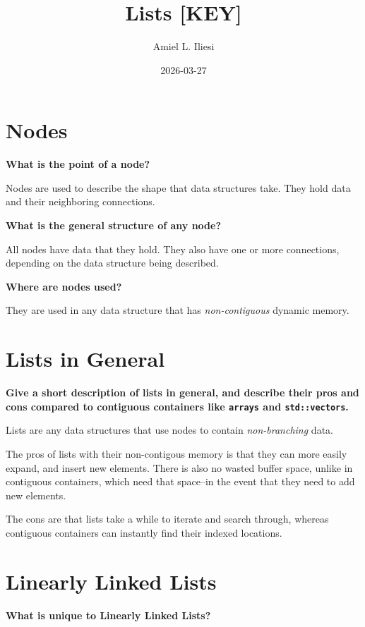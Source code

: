\documentclass[12pt, letterpaper]{article}
\title{Lists \color{red}\textbf{[KEY]}\normalcolor}
\author{Amiel L. Iliesi}
\date{2026-03-27}
\newcommand{\question}[1]{\textbf{#1}\par}
\newenvironment{ansblock}{\color{Green4}}{\normalcolor\vspace{1em}}
\begin{document}
\maketitle

\tableofcontents

\pagebreak
\section{Nodes}
\question{What is the point of a node?}
\begin{ansblock}
Nodes are used to describe the shape that data structures take. They hold data
and their neighboring connections.
\end{ansblock}

\question{What is the general structure of any node?}
\begin{ansblock}
All nodes have data that they hold. They also have one or more connections,
depending on the data structure being described.
\end{ansblock}

\question{Where are nodes used?}
\begin{ansblock}
They are used in any data structure that has \emph{non-contiguous} dynamic
memory.
\end{ansblock}

\pagebreak
\section{Lists in General}
\question{Give a short description of lists in general, and describe their pros
and cons compared to contiguous containers like \texttt{arrays} and
\texttt{std::vectors}.}

\begin{ansblock}
Lists are any data structures that use nodes to contain \emph{non-branching}
data.

The pros of lists with their non-contigous memory is that they can more easily
expand, and insert new elements. There is also no wasted buffer space, unlike
in contiguous containers, which need that space--in the event that they need
to add new elements.

The cons are that lists take a while to iterate and search through, whereas
contiguous containers can instantly find their indexed locations.
\end{ansblock}

\pagebreak
\section{Linearly Linked Lists}
\question{What is unique to Linearly Linked Lists?}
\end{document}
